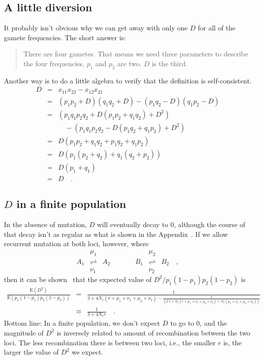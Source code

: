 \subsection*{A little diversion}

It probably isn't obvious why we can get away with only one $D$ for
all of the gamete frequencies. The short answer is:
\begin{quote}There are four gametes. That means we need three
  parameters to describe the four frequencies. $p_1$ and $p_2$ are
  two. $D$ is the third.
\end{quote}
Another way is to do a little algebra to verify that the definition is
self-consistent.
\begin{eqnarray*}
D &=& x_{11}x_{22} - x_{12}x_{21} \\
  &=& (p_1p_2 + D)(q_1q_2 + D) - (p_1q_2 - D)(q_1p_2 - D) \\
  &=& \left(p_1q_1p_2q_2 + D(p_1p_2 + q_1q_2) + D^2\right) \\
  && \quad - \left(p_1q_1p_2q_2 - D(p_1q_2 + q_1p_2) + D^2\right) \\
  &=& D(p_1p_2 + q_1q_2 + p_1q_2 + q_1p_2) \\
  &=& D\left(p_1(p_2 + q_2) + q_1(q_2 + p_2)\right) \\
  &=& D(p_1 + q_1) \\
  &=& D \quad. 
\end{eqnarray*}

\subsection*{$D$ in a finite population}

In the absence of mutation, $D$ will eventually decay to 0, although
the course of that decay isn't as regular as what is shown in the
Appendix~\cite{Hill-Robertson-1968}. If we allow recurrent mutation at
both loci, however, where
\[
\begin{array}{ccccccc}
    &\mu_1            &     &      &     &\mu_2 \\
A_1 &\rightleftharpoons& A_2 &\qquad& B_1 &\rightleftharpoons& B_2
\quad , \\
    &\nu_1            &     &      &     &\nu_2 
\end{array}
\]
then it can be shown~\cite{Ohta-Kimura-1969} that the expected value
of $D^2/p_1(1-p_1)p_2(1-p_2)$ is 
{\scriptsize
\begin{eqnarray*}
\frac{\mbox{E}(D^2)}{\mbox{E}(p_1(1-p_1)p_2(1-p_2))}
&=& \frac{1}{3 + 4N_e(r+\mu_1+\nu_1+\mu_2+\nu_2)
                           - \frac{2}{(2.5 + N_e(r+\mu_1+\nu_1+\mu_2+\nu_2)
                              + N_e(\mu_1+\nu_1+\mu_2+\nu_2))}} \\
&\approx& \frac{1}{3 + 4N_er} \quad .
\end{eqnarray*}}
Bottom line: In a finite population, we don't expect $D$ to go to 0,
and the magnitude of $D^2$ is inversely related to amount of
recombination between the two loci. The less recombination there is
between two loci, i.e., the smaller $r$ is, the larger the value of
$D^2$ we expect.

